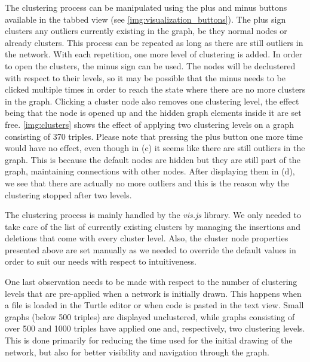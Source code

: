 The clustering process can be manipulated using the plus and minus buttons available in the tabbed view (see \autoref{img:visualization_buttons}). The plus sign clusters any outliers currently existing in the graph, be they normal nodes or already clusters. This process can be repeated as long as there are still outliers in the network. With each repetition, one more level of clustering is added. In order to open the clusters, the minus sign can be used. The nodes will be declustered with respect to their levels, so it may be possible that the minus needs to be clicked multiple times in order to reach the state where there are no more clusters in the graph. Clicking a cluster node also removes one clustering level, the effect being that the node is opened up and the hidden graph elements inside it are set free. \autoref{img:clusters} shows the effect of applying two clustering levels on a graph consisting of 370 triples. Please note that pressing the plus button one more time would have no effect, even though in (c) it seems like there are still outliers in the graph. This is because the default nodes are hidden but they are still part of the graph, maintaining connections with other nodes. After displaying them in (d), we see that there are actually no more outliers and this is the reason why the clustering stopped after two levels.  

The clustering process is mainly handled by the \textit{vis.js} library. We only needed to take care of the list of currently existing clusters by managing the insertions and deletions that come with every cluster level. Also, the cluster node properties presented above are set manually as we needed to override the default values in order to suit our needs with respect to intuitiveness.

One last observation needs to be made with respect to the number of clustering levels that are pre-applied when a network is initially drawn. This happens when a file is loaded in the Turtle editor or when code is pasted in the text view. Small graphs (below 500 triples) are displayed unclustered, while graphs consisting of over 500 and 1000 triples have applied one and, respectively, two clustering levels. This is done primarily for reducing the time used for the initial drawing of the network, but also for better visibility and navigation through the graph.


